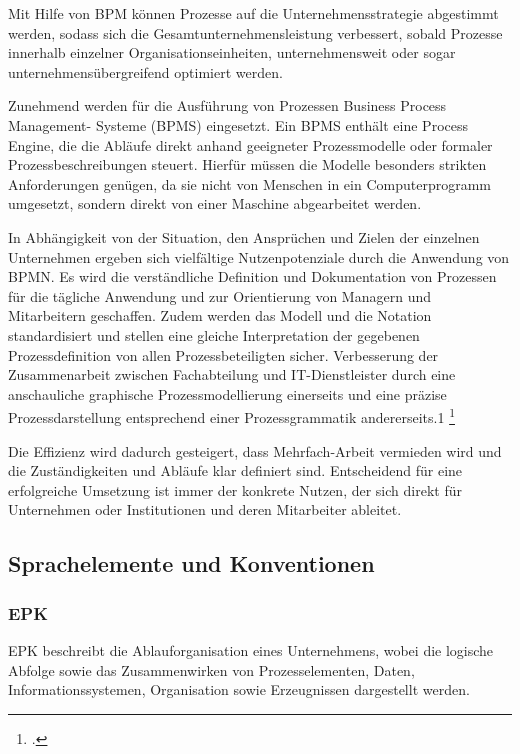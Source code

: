 Mit Hilfe von BPM können Prozesse auf die Unternehmensstrategie abgestimmt werden, 
sodass sich die Gesamtunternehmensleistung verbessert, sobald Prozesse innerhalb 
einzelner Organisationseinheiten, unternehmensweit oder sogar unternehmensübergreifend 
optimiert werden.

Zunehmend werden für die Ausführung von Prozessen Business Process Management-
Systeme (BPMS) eingesetzt. Ein BPMS enthält eine Process Engine, 
die die Abläufe direkt anhand geeigneter Prozessmodelle oder 
formaler Prozessbeschreibungen steuert. 
Hierfür müssen die Modelle besonders strikten Anforderungen genügen, 
da sie nicht von Menschen in ein Computerprogramm umgesetzt, 
sondern direkt von einer Maschine abgearbeitet werden.

In Abhängigkeit von der Situation, den Ansprüchen und Zielen der einzelnen
Unternehmen ergeben sich vielfältige Nutzenpotenziale 
durch die Anwendung von BPMN. Es wird die verständliche Definition 
und Dokumentation von Prozessen für die tägliche Anwendung und zur 
Orientierung von Managern und Mitarbeitern geschaffen. 
Zudem werden das Modell und die Notation standardisiert und stellen eine 
gleiche Interpretation der gegebenen Prozessdefinition 
von allen Prozessbeteiligten sicher. Verbesserung der Zusammenarbeit 
zwischen Fachabteilung und IT-Dienstleister durch eine 
anschauliche graphische Prozessmodellierung einerseits und eine präzise 
Prozessdarstellung entsprechend einer Prozessgrammatik andererseits.1
\footcite[S.1]{allweyer}

Die Effizienz wird dadurch gesteigert, dass Mehrfach-Arbeit vermieden wird und
die Zuständigkeiten und Abläufe klar definiert sind. 
Entscheidend für eine erfolgreiche Umsetzung ist immer der konkrete Nutzen, 
der sich direkt für Unternehmen oder Institutionen und deren Mitarbeiter ableitet.


\subsection{Sprachelemente und Konventionen}

\subsubsection{EPK}

EPK beschreibt die Ablauforganisation eines Unternehmens, wobei die logische
Abfolge sowie das Zusammenwirken von Prozesselementen, Daten,
Informationssystemen, Organisation sowie Erzeugnissen dargestellt werden.

